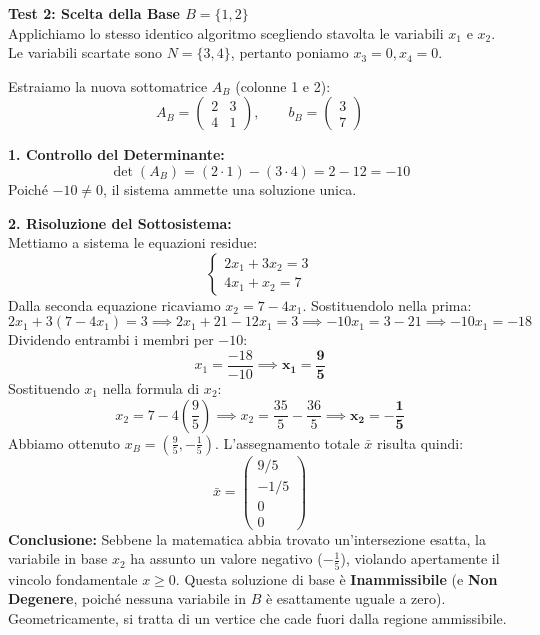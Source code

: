 \documentclass[12pt, a4paper]{article}
\newcommand{\separatore}{\noindent{\color{titlecolor!50}\rule{\textwidth}{0.6pt}}}
\begin{document}
	\vspace{0.6cm}
	\separatore
	\vspace{0.4cm}
	
	\textbf{Test 2: Scelta della Base $B = \{1, 2\}$}\\
	Applichiamo lo stesso identico algoritmo scegliendo stavolta le variabili $x_1$ e $x_2$. Le variabili scartate sono $N = \{3, 4\}$, pertanto poniamo $x_3 = 0, x_4 = 0$.
	
	Estraiamo la nuova sottomatrice $A_B$ (colonne 1 e 2):
	\[
	A_B = \begin{pmatrix} 2 & 3 \\ 4 & 1 \end{pmatrix}, \qquad b_B = \begin{pmatrix} 3 \\ 7 \end{pmatrix}
	\]
	
	\textbf{1. Controllo del Determinante:}\\
	\[
	\det(A_B) = (2 \cdot 1) - (3 \cdot 4) = 2 - 12 = -10
	\]
	Poiché $-10 \neq 0$, il sistema ammette una soluzione unica.
	
	\textbf{2. Risoluzione del Sottosistema:}\\
	Mettiamo a sistema le equazioni residue:
	\[
	\begin{cases}
		2x_1 + 3x_2 = 3 \\
		4x_1 + x_2 = 7
	\end{cases}
	\]
	Dalla seconda equazione ricaviamo $x_2 = 7 - 4x_1$. Sostituendolo nella prima:
	\[
	2x_1 + 3(7 - 4x_1) = 3 \implies 2x_1 + 21 - 12x_1 = 3 \implies -10x_1 = 3 - 21 \implies -10x_1 = -18
	\]
	Dividendo entrambi i membri per $-10$:
	\[
	x_1 = \frac{-18}{-10} \implies \mathbf{x_1 = \frac{9}{5}}
	\]
	Sostituendo $x_1$ nella formula di $x_2$:
	\[
	x_2 = 7 - 4\left(\frac{9}{5}\right) \implies x_2 = \frac{35}{5} - \frac{36}{5} \implies \mathbf{x_2 = -\frac{1}{5}}
	\]
	Abbiamo ottenuto $x_B = \left(\frac{9}{5}, -\frac{1}{5}\right)$. L'assegnamento totale $\bar{x}$ risulta quindi:
	\[
	\bar{x} = \begin{pmatrix} 9/5 \\ -1/5 \\ 0 \\ 0 \end{pmatrix}
	\]
	\textbf{Conclusione:} Sebbene la matematica abbia trovato un'intersezione esatta, la variabile in base $x_2$ ha assunto un valore negativo ($-\frac{1}{5}$), violando apertamente il vincolo fondamentale $x \geq 0$. Questa soluzione di base è \textbf{Inammissibile} (e \textbf{Non Degenere}, poiché nessuna variabile in $B$ è esattamente uguale a zero). Geometricamente, si tratta di un vertice che cade fuori dalla regione ammissibile.
	
\end{document}
